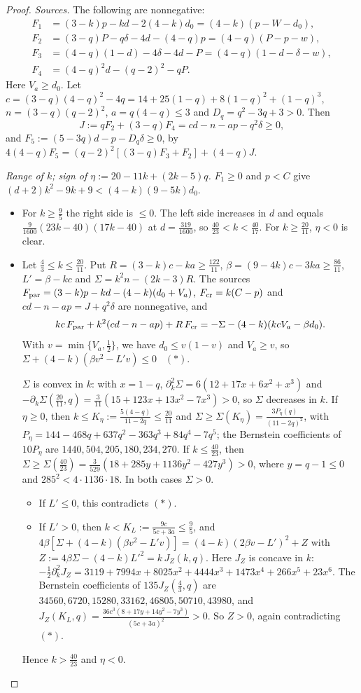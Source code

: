 \documentclass[11pt,a4paper]{article}
\numberwithin{equation}{section}
\theoremstyle{definition}
\begin{document}
\begin{proof}
\emph{Sources.} The following are nonnegative:
\begin{align*}
F_1&=(3-k)p-kd-2(4-k)d_0=(4-k)(p-W-d_0),\\
F_2&=(3-q)P-q\delta-4d-(4-q)p=(4-q)(P-p-w),\\
F_3&=(4-q)(1-d)-4\delta-4d-P=(4-q)(1-d-\delta-w),\\
F_4&=(4-q)^2d-(q-2)^2-qP .
\end{align*}
Here $V_a\ge d_0$. Let
$c=(3-q)(4-q)^2-4q=14+25(1-q)+8(1-q)^2+(1-q)^3$, $n=(3-q)(q-2)^2$,
$a=q(4-q)\le3$ and $D_q=q^2-3q+3>0$. Then
\[
J:=qF_2+(3-q)F_4=cd-n-ap-q^2\delta\ge0,
\]
and $F_5:=(5-3q)d-p-D_q\delta\ge0$, by
$4(4-q)F_5=(q-2)^2[(3-q)F_3+F_2]+(4-q)J$.

\emph{Range of $k$; sign of $\eta:=20-11k+(2k-5)q$.} $F_1\ge0$ and $p<C$ give
$(d+2)k^2-9k+9<(4-k)(9-5k)d_0$.
\begin{itemize}
\item For $k\ge\frac95$ the right side is $\le0$. The left side increases in
$d$ and equals $\frac9{1600}(23k-40)(17k-40)$ at $d=\frac{319}{1600}$, so
$\frac{40}{23}<k<\frac{40}{17}$. For $k\ge\frac{20}{11}$, $\eta<0$ is clear.
\item Let $\frac43\le k\le\frac{20}{11}$. Put $R=(3-k)c-ka\ge\frac{122}{11}$,
$\beta=(9-4k)c-3ka\ge\frac{86}{11}$, $L'=\beta-kc$ and
$\Sigma=k^2n-(2k-3)R$. The sources $F_{\rm par}=(3-k)p-kd-(4-k)(d_0+V_a)$,
$F_{\rm cr}=k(C-p)$ and $cd-n-ap=J+q^2\delta$ are nonnegative, and
\[
kc\,F_{\rm par}+k^2(cd-n-ap)+R\,F_{\rm cr}=-\Sigma-(4-k)(kcV_a-\beta d_0).
\]
With $v=\min\{V_a,\frac12\}$, we have $d_0\le v(1-v)$ and $V_a\ge v$, so
$\Sigma+(4-k)(\beta v^2-L'v)\le0$ \ $(\ast)$.

$\Sigma$ is convex in $k$: with $x=1-q$, $\partial_k^2\Sigma=6(12+17x+6x^2+x^3)$
and $-\partial_k\Sigma(\frac{20}{11},q)=\frac3{11}(15+123x+13x^2-7x^3)>0$, so
$\Sigma$ decreases in $k$. If $\eta\ge0$, then
$k\le K_\eta:=\frac{5(4-q)}{11-2q}\le\frac{20}{11}$ and
$\Sigma\ge\Sigma(K_\eta)=\frac{3P_\eta(q)}{(11-2q)^2}$, with
$P_\eta=144-468q+637q^2-363q^3+84q^4-7q^5$; the Bernstein coefficients of
$10P_\eta$ are $1440,504,205,180,234,270$. If $k\le\frac{40}{23}$, then
$\Sigma\ge\Sigma(\frac{40}{23})=\frac3{529}(18+285y+1136y^2-427y^3)>0$, where
$y=q-1\le0$ and $285^2<4\cdot1136\cdot18$. In both cases $\Sigma>0$.
\begin{itemize}
\item If $L'\le0$, this contradicts $(\ast)$.
\item If $L'>0$, then $k<K_L:=\frac{9c}{5c+3a}\le\frac95$, and
$4\beta[\Sigma+(4-k)(\beta v^2-L'v)]=(4-k)(2\beta v-L')^2+Z$ with
$Z:=4\beta\Sigma-(4-k)L'^2=k\,J_Z(k,q)$. Here $J_Z$ is concave in $k$:
$-\frac12\partial_k^2J_Z=3119+7994x+8025x^2+4444x^3+1473x^4+266x^5+23x^6$. The
Bernstein coefficients of $135J_Z(\frac43,q)$ are
$34560,6720,15280,33162,46805,50710,43980$, and
$J_Z(K_L,q)=\frac{36c^3(8+17y+14y^2-7y^3)}{(5c+3a)^2}>0$. So $Z>0$, again
contradicting $(\ast)$.
\end{itemize}
Hence $k>\frac{40}{23}$ and $\eta<0$.
\end{itemize}


\end{proof}
\end{document}
